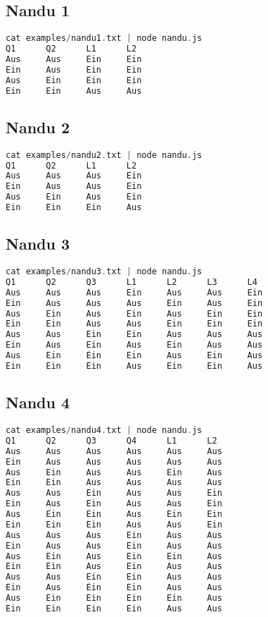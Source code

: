 \documentclass[a4paper,10pt,ngerman]{scrartcl}
\begin{document}
\subsection*{Nandu 1}
\begin{lstlisting}[language=C++]
cat examples/nandu1.txt | node nandu.js
Q1      Q2      L1      L2
Aus     Aus     Ein     Ein
Ein     Aus     Ein     Ein
Aus     Ein     Ein     Ein
Ein     Ein     Aus     Aus
\end{lstlisting}

\subsection*{Nandu 2}
\begin{lstlisting}[language=C++]
cat examples/nandu2.txt | node nandu.js
Q1      Q2      L1      L2
Aus     Aus     Aus     Ein
Ein     Aus     Aus     Ein
Aus     Ein     Aus     Ein
Ein     Ein     Ein     Aus
\end{lstlisting}

\subsection*{Nandu 3}
\begin{lstlisting}[language=C++]
cat examples/nandu3.txt | node nandu.js
Q1      Q2      Q3      L1      L2      L3      L4
Aus     Aus     Aus     Ein     Aus     Aus     Ein
Ein     Aus     Aus     Aus     Ein     Aus     Ein
Aus     Ein     Aus     Ein     Aus     Ein     Ein
Ein     Ein     Aus     Aus     Ein     Ein     Ein
Aus     Aus     Ein     Ein     Aus     Aus     Aus
Ein     Aus     Ein     Aus     Ein     Aus     Aus
Aus     Ein     Ein     Ein     Aus     Ein     Aus
Ein     Ein     Ein     Aus     Ein     Ein     Aus
\end{lstlisting}

\subsection*{Nandu 4}
\begin{lstlisting}[language=C++]
cat examples/nandu4.txt | node nandu.js
Q1      Q2      Q3      Q4      L1      L2
Aus     Aus     Aus     Aus     Aus     Aus
Ein     Aus     Aus     Aus     Aus     Aus
Aus     Ein     Aus     Aus     Ein     Aus
Ein     Ein     Aus     Aus     Aus     Aus
Aus     Aus     Ein     Aus     Aus     Ein
Ein     Aus     Ein     Aus     Aus     Ein
Aus     Ein     Ein     Aus     Ein     Ein
Ein     Ein     Ein     Aus     Aus     Ein
Aus     Aus     Aus     Ein     Aus     Aus
Ein     Aus     Aus     Ein     Aus     Aus
Aus     Ein     Aus     Ein     Ein     Aus
Ein     Ein     Aus     Ein     Aus     Aus
Aus     Aus     Ein     Ein     Aus     Aus
Ein     Aus     Ein     Ein     Aus     Aus
Aus     Ein     Ein     Ein     Ein     Aus
Ein     Ein     Ein     Ein     Aus     Aus
\end{lstlisting}
\end{document}

